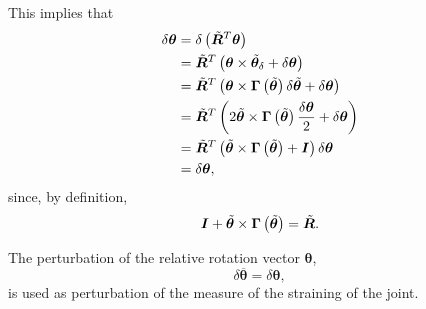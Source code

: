 \documentclass[10pt,dvips,fleqn,subeqn]{report}
\newcommand{\T}[1]{\bm{#1}}
\begin{document}
This implies that
\begin{align}
	\delta\T{\theta}
	&= \delta\plbr{\tilde{\T{R}}^T \T{\theta}}
	\nonumber \\
	&= \tilde{\T{R}}^T \plbr{
		\T{\theta} \times \tilde{\T{\theta}}_{\delta}
		+ \delta\T{\theta}
	}
	\nonumber \\
	&= \tilde{\T{R}}^T \plbr{
		\T{\theta} \times \T{\Gamma}\plbr{\tilde{\T{\theta}}} \delta\tilde{\T{\theta}}
		+ \delta\T{\theta}
	}
	\nonumber \\
	&= \tilde{\T{R}}^T \plbr{
		2 \tilde{\T{\theta}} \times \T{\Gamma}\plbr{\tilde{\T{\theta}}} \frac{\delta\T{\theta}}{2}
		+ \delta\T{\theta}
	}
	\nonumber \\
	&= \tilde{\T{R}}^T \plbr{
		\tilde{\T{\theta}} \times \T{\Gamma}\plbr{\tilde{\T{\theta}}}
		+ \T{I}
	} \delta\T{\theta}
	\nonumber \\
	&= \delta\T{\theta} ,
\end{align}
since, by definition,
\begin{equation}
	\T{I} + \tilde{\T{\theta}} \times \T{\Gamma}\plbr{\tilde{\T{\theta}}} = \tilde{\T{R}} .
\end{equation}

The perturbation of the relative rotation vector $\T{\theta}$, 
\begin{equation}
	\delta\overline{\T{\theta}} = \delta\T{\theta} ,
\end{equation}
is used as perturbation of the measure of the straining of the joint.
\end{document}
